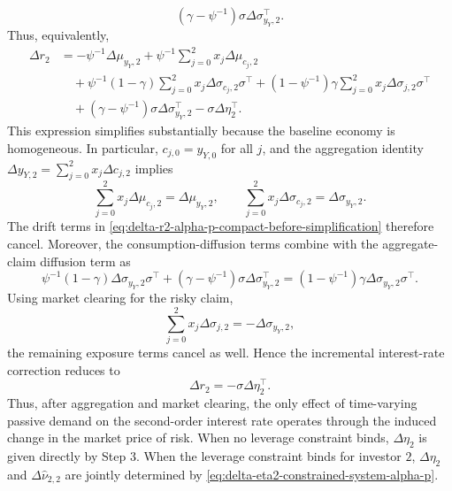 \begin{equation}
    \left(\gamma-\psi^{-1}\right)\sigma\Delta\sigma_{y_Y,2}^\top.
\end{equation}
Thus, equivalently,
\begin{align}\label{eq:delta-r2-alpha-p-compact-before-simplification}
    \Delta r_2
    &= -\psi^{-1}\Delta\mu_{y_Y,2}
    +\psi^{-1}\sum_{j=0}^2 x_j\Delta\mu_{c_j,2} 
    \nonumber\\
    &\quad +\psi^{-1}(1-\gamma)\sum_{j=0}^2 x_j\Delta\sigma_{c_j,2}\sigma^\top
    +(1-\psi^{-1})\gamma\sum_{j=0}^2 x_j\Delta\sigma_{j,2}\sigma^\top 
    \nonumber\\
    &\quad +\left(\gamma-\psi^{-1}\right)\sigma\Delta\sigma_{y_Y,2}^\top
    -\sigma\Delta\eta_2^\top.
\end{align}
This expression simplifies substantially because the baseline economy is homogeneous.
In particular, $c_{j,0}=y_{Y,0}$ for all $j$, and the aggregation identity $\Delta y_{Y,2}=\sum_{j=0}^2x_j\Delta c_{j,2}$ implies
\begin{equation}
    \sum_{j=0}^2x_j\Delta\mu_{c_j,2}=\Delta\mu_{y_Y,2},
    \qquad
    \sum_{j=0}^2x_j\Delta\sigma_{c_j,2}=\Delta\sigma_{y_Y,2}.
\end{equation}
The drift terms in \eqref{eq:delta-r2-alpha-p-compact-before-simplification} therefore cancel.
Moreover, the consumption-diffusion terms combine with the aggregate-claim diffusion term as
\begin{equation}
    \psi^{-1}(1-\gamma)\Delta\sigma_{y_Y,2}\sigma^\top
    +\left(\gamma-\psi^{-1}\right)\sigma\Delta\sigma_{y_Y,2}^\top
    =(1-\psi^{-1})\gamma\Delta\sigma_{y_Y,2}\sigma^\top.
\end{equation}
Using market clearing for the risky claim,
\begin{equation}
    \sum_{j=0}^2x_j\Delta\sigma_{j,2}= -\Delta\sigma_{y_Y,2},
\end{equation}
the remaining exposure terms cancel as well.
Hence the incremental interest-rate correction reduces to
\begin{equation}\label{eq:delta-r2-alpha-p-compact}
    \Delta r_2=-\sigma\Delta\eta_2^\top.
\end{equation}
Thus, after aggregation and market clearing, the only effect of time-varying passive demand on the second-order interest rate operates through the induced change in the market price of risk.
When no leverage constraint binds, $\Delta\eta_2$ is given directly by Step 3.
When the leverage constraint binds for investor $2$, $\Delta\eta_2$ and $\Delta\hat{\nu}_{2,2}$ are jointly determined by \eqref{eq:delta-eta2-constrained-system-alpha-p}.


